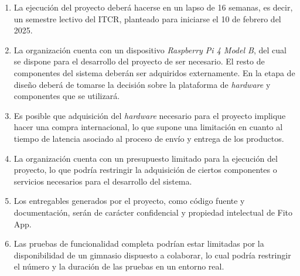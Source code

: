 \begin{enumerate}
    \item La ejecución del proyecto deberá hacerse en un lapso de 16 semanas, es decir, un semestre lectivo del ITCR, planteado para iniciarse el 10 de febrero del 2025.
    \item La organización cuenta con un dispositivo \textit{Raspberry Pi 4 Model B}, del cual se dispone para el desarrollo del proyecto de ser necesario. El resto de componentes del sistema deberán ser adquiridos externamente. En la etapa de diseño deberá de tomarse la decisión sobre la plataforma de \textit{hardware} y componentes que se utilizará.
    \item Es posible que adquisición del \textit{hardware} necesario para el proyecto implique hacer una compra internacional, lo que supone una limitación en cuanto al tiempo de latencia asociado al proceso de envío y entrega de los productos.
    \item La organización cuenta con un presupuesto limitado para la ejecución del proyecto, lo que podría restringir la adquisición de ciertos componentes o servicios necesarios para el desarrollo del sistema.
    \item Los entregables generados por el proyecto, como código fuente y documentación, serán de carácter confidencial y propiedad intelectual de Fito App.
    \item Las pruebas de funcionalidad completa podrían estar limitadas por la disponibilidad de un gimnasio dispuesto a colaborar, lo cual podría restringir el número y la duración de las pruebas en un entorno real.
\end{enumerate}



